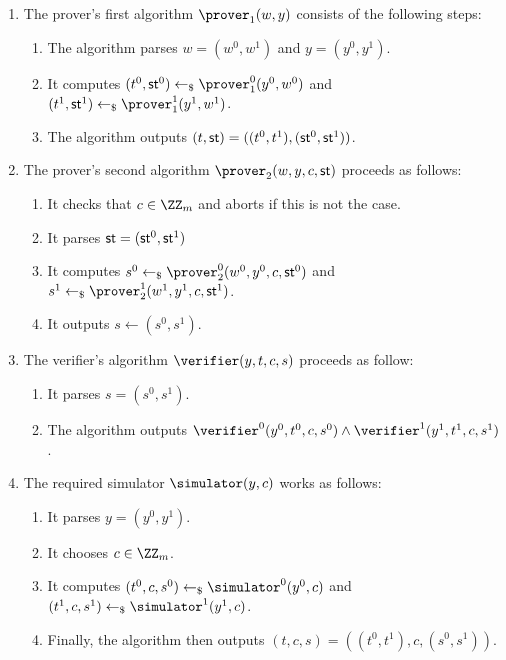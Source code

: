 \documentclass[runningheads]{llncs}
\begin{document}
\begin{enumerate}
  \item
    The prover's first algorithm $\prover_1(w,y)$ consists of the following steps:
    \begin{enumerate}
      \item
        The algorithm parses $w=(w^0,w^1)$ and $y=(y^0,y^1)$.
      \item
        It computes $(t^0,\st^0)\getsr\prover_1^0(y^0,w^0)$ and $(t^1,\st^1)\getsr\prover_1^1(y^1,w^1)$.
      \item
	The algorithm outputs $(t,\mathsf{st}) = ((t^0,t^1),(\mathsf{st}^0,\mathsf{st}^1))$.
    \end{enumerate}
  \item
    The prover's second algorithm $\prover_2(w,y,c,\st)$ proceeds as follows:
    \begin{enumerate}
      \item
        It checks that $c\in\ZZ_m$ and aborts if this is not the case.
      \item
	It parses $\mathsf{st}=(\mathsf{st}^0,\mathsf{st}^1)$
      \item
        It computes $s^0\getsr\prover_2^0(w^0,y^0,c,\st^0)$ and $s^1\getsr\prover_2^1(w^1,y^1,c,\st^1)$.
      \item
        It outputs $s\gets(s^0,s^1)$.
    \end{enumerate}
  \item
    The verifier's algorithm $\verifier(y,t,c,s)$ proceeds as follow:
    \begin{enumerate}
      \item
        It  parses $s=(s^0,s^1)$.
      \item
	The algorithm outputs $\verifier^0(y^0,t^0,c,s^0)\land\verifier^1(y^1,t^1,c,s^1)$.
    \end{enumerate}
  \item
    The required simulator $\simulator(y,c)$ works as follows:
    \begin{enumerate}
      \item
        It parses $y=(y^0,y^1)$.
      \item
        It chooses $c\in\ZZ_m$.
      \item
        It computes $(t^0,c,s^0)\getsr\simulator^0(y^0,c)$ and $(t^1,c,s^1)\getsr\simulator^1(y^1,c)$.
      \item
        Finally, the algorithm then outputs $(t,c,s)=((t^0,t^1),c,(s^0,s^1))$.
    \end{enumerate}
\end{enumerate}
\end{document}
